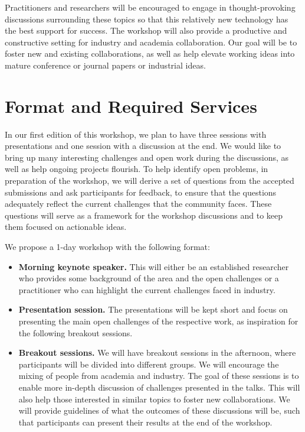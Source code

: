 \documentclass[10pt, conference]{IEEEtran}
\begin{document}
Practitioners and researchers will be encouraged to engage in thought-provoking discussions surrounding these topics so that this relatively new technology has the best support for success. The workshop will also provide a productive and constructive setting for industry and academia collaboration. Our goal will be to foster new and existing collaborations, as well as help elevate working ideas into mature conference or journal papers or industrial ideas.

\section{Format and Required Services}


In our first edition of this workshop, we plan to have three sessions with presentations and one session with a discussion at the end. We would like to bring up many interesting challenges and open work during the discussions, as well as help ongoing projects flourish. To help identify open problems, in preparation of the workshop, we will derive a set of questions from the accepted submissions and ask participants for feedback, to ensure that the questions adequately reflect the current challenges that the community faces. These questions will serve as a framework for the workshop discussions and to keep them focused on actionable ideas. 

We propose a 1-day workshop with the following format:

\begin{itemize}

	\item \textbf{Morning keynote speaker.} This will either be an established researcher who provides some background of the area and the open challenges or a practitioner who can highlight the current challenges faced in industry.

	\item \textbf{Presentation session.} The presentations will be kept short and focus on presenting the main open challenges of the respective work, as inspiration for the following breakout sessions.

	\item \textbf{Breakout sessions.} We will have breakout sessions in the afternoon, where participants will be divided into different groups. We will encourage the mixing of people from academia and industry. The goal of these sessions is to enable more in-depth discussion of challenges presented in the talks. This will also help those interested in similar topics to foster new collaborations. We will provide guidelines of what the outcomes of these discussions will be, such that participants can present their results at the end of the workshop.

\end{itemize}
\end{document}
